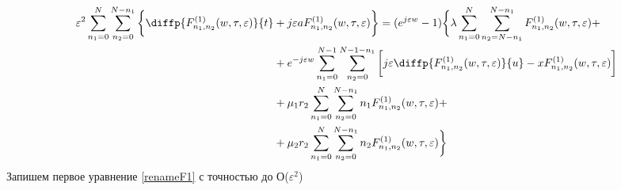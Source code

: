 \begin{equation}
\begin{split}
		\varepsilon^{2}\sum_{n_1=0}^N\sum_{n_2=0}^{N-n_1}\bigg\{ \diffp{F_{n_1,n_2}^{(1)}(w,\tau,\varepsilon)}{t}&+j\varepsilon a F_{n_1,n_2}^{(1)}(w,\tau,\varepsilon)\bigg\}=
		(e^{j\varepsilon w} - 1)\bigg\{\lambda \sum_{n_1=0}^N\sum_{n_2=N-n_1}^{N-n_1} 
		F_{n_1, n_2}^{(1)}(w,\tau,\varepsilon)+\\
		&+e^{-j\varepsilon w} \sum_{n_1=0}^{N-1}\sum_{n_2=0}^{N-1-n_1} 
		\bigg[ j \varepsilon \diffp{ F_{n_1, n_2}^{(1)}(w,\tau,\varepsilon)}{u}-xF_{n_1, n_2}^{(1)}(w,\tau,\varepsilon)\bigg]\\
		&+\mu_1 r_2 \sum_{n_1=0}^{N}\sum_{n_2=0}^{N-n_1} 
		n_1 F_{n_1, n_2}^{(1)}(w,\tau,\varepsilon)+\\
		&+\mu_2 r_2 \sum_{n_1=0}^{N}\sum_{n_2=0}^{N-n_1} 
		n_2 F_{n_1, n_2}^{(1)}(w,\tau,\varepsilon)\bigg\}\
	\end{split}
\end{equation}
 Запишем первое уравнение \eqref{renameF1} с точностью до О($\varepsilon^2$)
